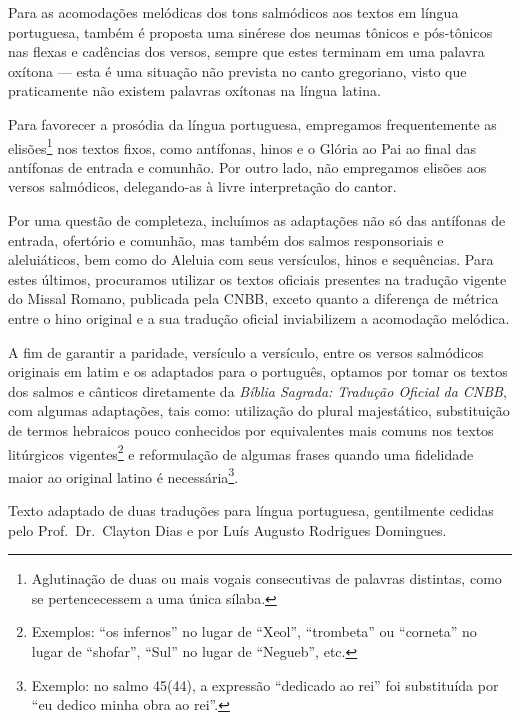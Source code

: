 Para as acomodações melódicas dos tons salmódicos aos textos em língua portuguesa, também é proposta uma sinérese dos neumas tônicos e pós-tônicos nas flexas e cadências dos versos, sempre que estes terminam em uma palavra oxítona --- esta é uma situação não prevista no canto gregoriano, visto que praticamente não existem palavras oxítonas na língua latina.

Para favorecer a prosódia da língua portuguesa, empregamos frequentemente as elisões\footnote{Aglutinação de duas ou mais vogais consecutivas de palavras distintas, como se pertencecessem a uma única sílaba.} nos textos fixos, como antífonas, hinos e o \textcolor{gregoriocolor}{Glória ao Pai} ao final das antífonas de entrada e comunhão. Por outro lado, não empregamos elisões aos versos salmódicos, delegando-as à livre interpretação do cantor.

Por uma questão de completeza, incluímos as adaptações não só das antífonas de entrada, ofertório e comunhão, mas também dos salmos responsoriais e aleluiáticos, bem como do Aleluia com seus versículos, hinos e sequências. Para estes últimos, procuramos utilizar os textos oficiais presentes na tradução vigente do Missal Romano, publicada pela CNBB, exceto quanto a diferença de métrica entre o hino original e a sua tradução oficial inviabilizem a acomodação melódica.

A fim de garantir a paridade, versículo a versículo, entre os versos salmódicos originais em latim e os adaptados para o português, optamos por tomar os textos dos salmos e cânticos diretamente da \emph{Bíblia Sagrada: Tradução Oficial da CNBB}, com algumas adaptações, tais como: utilização do plural majestático, substituição de termos hebraicos pouco conhecidos por equivalentes mais comuns nos textos litúrgicos vigentes\footnote{Exemplos: ``os infernos'' no lugar de ``Xeol'', ``trombeta'' ou ``corneta'' no lugar de ``shofar'', ``Sul'' no lugar de ``Negueb'', etc.} e reformulação de algumas frases quando uma fidelidade maior ao original latino é necessária\footnote{Exemplo: no salmo 45(44), a expressão ``dedicado ao rei'' foi substituída por ``eu dedico minha obra ao rei''.}.

\AllowPageFlush

\label{section:praenotanda}

\begin{center}
  \begin{rubrica}
    Texto adaptado de duas traduções para língua portuguesa, gentilmente cedidas pelo Prof.\ Dr.\ Clayton Dias e por Luís Augusto Rodrigues Domingues.
  \end{rubrica}
\end{center}

